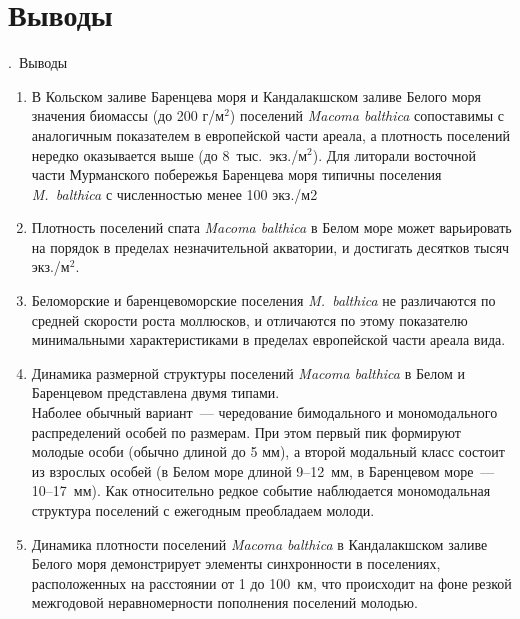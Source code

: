 \documentclass[aspectratio=169, xcolor=table]{beamer}
\begin{document}
		\section{Выводы}

\begin{frame}{\insertpagenumber.\ Выводы}
	\begin{scriptsize}
\addtocounter{enumi}{0}
	\begin{enumerate}
		\item В Кольском заливе Баренцева моря и Кандалакшском заливе  Белого моря значения биомассы (до 200 г/м$^2$) поселений {\it Macoma balthica} сопоставимы с аналогичным показателем в европейской части ареала, а плотность поселений нередко оказывается выше (до 8~тыс.~экз./м$^2$). Для литорали восточной части Мурманского побережья Баренцева моря типичны поселения {\it M.~balthica} с численностью менее 100 экз./м2 
		\item Плотность поселений спата {\it Macoma balthica} в Белом море может варьировать на порядок в пределах незначительной акватории, и достигать десятков тысяч экз./м$^2$.
		\item Беломорские и баренцевоморские поселения {\it M.~balthica} не различаются по средней скорости роста моллюсков, и отличаются по этому показателю минимальными характеристиками в пределах европейской части ареала вида. 
		\item Динамика размерной структуры поселений {\it Macoma balthica} в Белом и Баренцевом представлена двумя типами. \\
Наболее обычный вариант~--- чередование бимодального и мономодального распределений особей по размерам. При этом первый пик формируют молодые
особи (обычно длиной до 5 мм), а второй модальный класс состоит из взрослых особей (в Белом море длиной 9--12~мм, в Баренцевом море~--- 10--17~мм).
Как относительно редкое событие наблюдается мономодальная структура поселений с ежегодным преобладаем молоди.
		\item Динамика плотности поселений {\it Macoma balthica} в Кандалакшском заливе Белого моря демонстрирует элементы синхронности в поселениях, расположенных на расстоянии от 1 до 100~км, что происходит на фоне резкой межгодовой неравномерности пополнения поселений молодью.  
	\end{enumerate}
	\end{scriptsize}
\end{frame}
\end{document}

